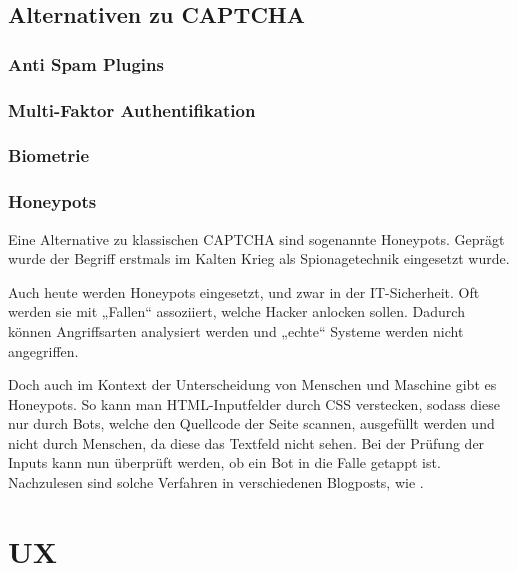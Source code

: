 \subsection{Alternativen zu CAPTCHA}
\subsubsection{Anti Spam Plugins}
\subsubsection{Multi-Faktor Authentifikation}
\subsubsection{Biometrie}
\subsubsection{Honeypots}

Eine Alternative zu klassischen CAPTCHA sind sogenannte Honeypots. 
Geprägt wurde der Begriff erstmals im Kalten Krieg als Spionagetechnik eingesetzt wurde. \cite[p.2]{joshi:2011} 

Auch heute werden Honeypots eingesetzt, und zwar in der IT-Sicherheit. 
Oft werden sie mit „Fallen“ assoziiert, welche Hacker anlocken sollen. 
Dadurch können Angriffsarten analysiert werden und „echte“ Systeme werden nicht angegriffen.

Doch auch im Kontext der Unterscheidung von Menschen und Maschine gibt es Honeypots. 
So kann man HTML-Inputfelder durch CSS verstecken, sodass diese nur durch Bots, welche den Quellcode der Seite scannen, ausgefüllt werden 
und nicht durch Menschen, da diese das Textfeld nicht sehen. 
Bei der Prüfung der Inputs kann nun überprüft werden, ob ein Bot in die Falle getappt ist. 
Nachzulesen sind solche Verfahren in verschiedenen Blogposts, wie \cite{perry:2019}.


\section{UX}

